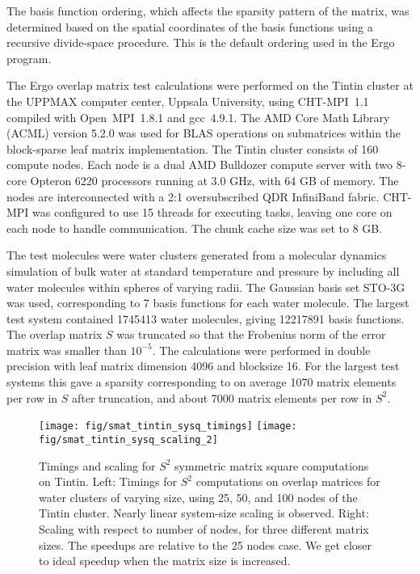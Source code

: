 \documentclass{elsarticle}
\begin{document}
The basis function ordering, which affects the sparsity pattern of the
matrix, was determined based on the spatial coordinates of the basis
functions using a recursive divide-space procedure. This is the
default ordering used in the {\sc Ergo} program.

The {\sc Ergo} overlap matrix test calculations were performed on the
Tintin cluster at the UPPMAX computer center, Uppsala University,
using CHT-MPI~1.1 compiled with Open~MPI~1.8.1 and gcc~4.9.1. The AMD Core Math
Library (ACML) version 5.2.0 was used for BLAS operations on
submatrices within the block-sparse leaf matrix implementation.
The Tintin cluster consists of 160 compute nodes. Each node is a
dual AMD Bulldozer compute server with two 8-core Opteron 6220
processors running at 3.0 GHz, with 64 GB of memory. The
nodes are interconnected with a 2:1 oversubscribed QDR InfiniBand
fabric.
CHT-MPI was configured to use 15 threads for executing tasks, leaving
one core on each node to handle communication. The chunk cache size
was set to 8 GB.

The test molecules were water clusters generated from a
molecular dynamics simulation of bulk water at standard temperature
and pressure by including all water molecules within spheres of
varying radii. The Gaussian basis set STO-3G was used, corresponding
to 7 basis functions for each water molecule.
The largest test system contained 1745413 water molecules, giving
12217891 basis functions.
The overlap matrix $S$ was truncated so that the Frobenius norm of the
error matrix was smaller than $10^{-5}$.
The calculations were performed in double precision with leaf matrix
dimension 4096 and blocksize 16.
For the largest test systems this gave a sparsity corresponding to on
average 1070 matrix elements per row in $S$ after truncation, and
about 7000 matrix elements per row in $S^2$.

\begin{figure}
  \begin{center}
    \texttt{[image: fig/smat\_tintin\_sysq\_timings]}
    \texttt{[image: fig/smat\_tintin\_sysq\_scaling\_2]}
  \end{center}
  \caption{Timings and scaling for $S^2$ symmetric matrix square computations on
    Tintin.  Left: Timings for $S^2$ computations on
    overlap matrices for water clusters of varying size, using 25, 50,
    and 100 nodes of the Tintin cluster. Nearly linear
    system-size scaling is observed. Right: Scaling with respect to
    number of nodes, for three different matrix sizes. The speedups are
    relative to the 25 nodes case. We get closer to ideal
    speedup when the matrix size is increased.
    \label{fig:smat_tintin_sysq_timings_and_scaling_tintin}}
\end{figure}
\end{document}
